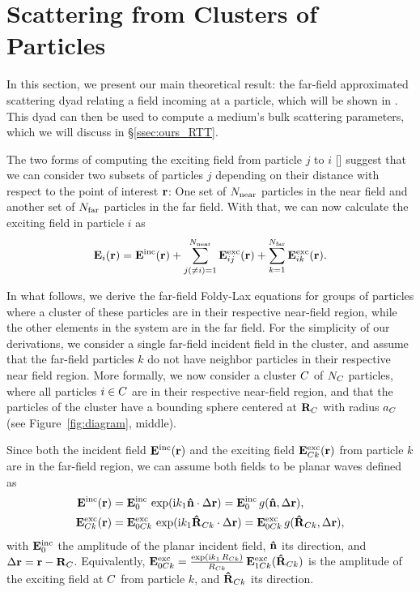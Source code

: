 \section{Scattering from Clusters of Particles}
\label{sec:ours_theory}
%
%
In this section, we present our main theoretical result: the far-field approximated scattering dyad relating a field incoming at a particle, which will be shown in .
This dyad can then be used to compute a medium's bulk scattering parameters, which we will discuss in \S\ref{ssec:ours_RTT}.

The two forms of computing the exciting field from particle $j$ to $i$ [] suggest that we can consider two subsets of particles $j$ depending on their distance with respect to the point of interest $\mathbf{r}$: One set of ${N_{\text{near}}}$ particles in the near field and another set of ${N_{\text{far}}}$ particles in the far field. With that, we can now calculate the exciting field in particle $i$ as
%
\begin{equation}
    \mathbf{E}_i(\mathbf{r})= \mathbf{E}^\text{inc}(\mathbf{r}) + \sum_{j(\neq i)=1}^{N_{\text{near}}} \mathbf{E}^\text{exc}_{ij}(\mathbf{r}) + \sum_{k=1}^{N_{\text{far}}} \mathbf{E}^\text{exc}_{ik}(\mathbf{r}).
    \label{eq:foldylaxtwo}
\end{equation}

In what follows, we derive the far-field Foldy-Lax equations for groups of particles where a cluster of these particles are in their respective near-field region, while the other elements in the system are in the far field. For the simplicity of our derivations, we consider a single far-field incident field in the cluster, and assume that the far-field particles $k$ do not have neighbor particles in their respective near field region.
%
More formally, we now consider a cluster $C$ of $N_C$ particles, where all particles $i\in C$ are in their respective near-field region, and that the particles of the cluster have a bounding sphere centered at $\mathbf{R}_C$ with radius $a_C$ (see Figure~\ref{fig:diagram}, middle). 

Since both the incident field $\mathbf{E}^\text{inc}(\mathbf{r})$ and the exciting field $\mathbf{E}^\text{exc}_{C k}(\mathbf{r})$ from particle $k$ are in the far-field region, we can assume both fields to be planar waves defined as
%
\begin{align}
    \label{eq:farincfieldcluster}
    \mathbf{E}^\text{inc}(\mathbf{r}) &= \mathbf{E}^\text{inc}_0 \,\exp(\text{i} k_1 \mathbf{\hat{n}} \cdot \Delta \mathbf{r}) = \mathbf{E}^\text{inc}_0\,g(\mathbf{\hat{n}}, \Delta \mathbf{r}) , \\
    \mathbf{E}^\text{exc}_{C k}(\mathbf{r}) &= \mathbf{E}^\text{exc}_{0C k}\,\exp(\text{i} k_1 \mathbf{\hat{R}}_{C k} \cdot \Delta \mathbf{r}) =  \mathbf{E}^\text{exc}_{0C k}\,g(\mathbf{\hat{R}}_{C k}, \Delta \mathbf{r}), 
    \label{eq:farexcfieldcluster} 
\end{align}
%  
with $\mathbf{E}^\text{inc}_0$ the amplitude of the planar incident field, $\mathbf{\hat{n}}$ its direction, and $\Delta \mathbf{r}=\mathbf{r}-\mathbf{R}_C$. Equivalently, $\mathbf{E}^\text{exc}_{0C k}=\frac{\exp(\text{i} k_1 \,R_{C k})}{R_{C k}}\,\mathbf{E}^\text{exc}_{1C k}(\mathbf{\hat{R}}_{C k})$  is the amplitude of the exciting field at $C$ from particle $k$, and $\mathbf{\hat{R}}_{C k}$ its direction. 

